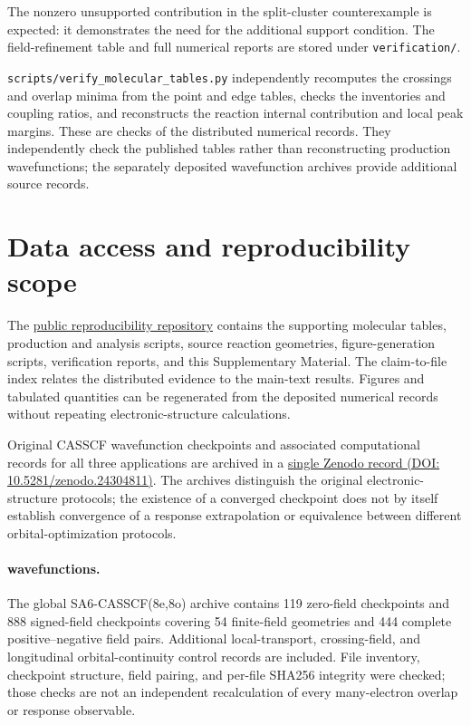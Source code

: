 \documentclass[aip,jcp,amsmath,amssymb,preprint,floatfix]{revtex4-1}
\begin{document}


The nonzero unsupported contribution in the split-cluster counterexample
is expected: it demonstrates the need for the additional support condition.
The field-refinement table and full numerical reports are stored under
\texttt{verification/}.

\texttt{scripts/verify\_molecular\_tables.py} independently recomputes the
 crossings and overlap minima from the point and edge tables,
checks the  inventories and coupling ratios, and reconstructs
the reaction internal contribution and local peak margins. These are
checks of the distributed numerical records. They independently check the published tables rather than reconstructing
production wavefunctions; the separately deposited wavefunction archives
provide additional source records.

\section{Data access and reproducibility scope}\label{sec:data}
The \href{https://github.com/zzdbl520/quantum-geometry-response-data/tree/main/multistate}{public reproducibility repository}
contains the supporting molecular tables, production and analysis scripts,
source reaction geometries, figure-generation scripts, verification reports,
and this Supplementary Material. The claim-to-file index relates the
distributed evidence to the main-text results. Figures and tabulated
quantities can be regenerated from the deposited numerical records without
repeating electronic-structure calculations.

Original CASSCF wavefunction checkpoints and associated computational
records for all three applications are archived in a
\href{https://doi.org/10.5281/zenodo.24304811}{single Zenodo record
(DOI: 10.5281/zenodo.24304811)}. The archives distinguish the original
electronic-structure protocols; the existence of a converged checkpoint
does not by itself establish convergence of a response extrapolation
or equivalence between different orbital-optimization protocols.

\paragraph*{\texorpdfstring{}{C2} wavefunctions.}
The global SA6-CASSCF(8e,8o) archive contains 119 zero-field checkpoints
and 888 signed-field checkpoints covering 54 finite-field geometries and
444 complete positive--negative field pairs. Additional local-transport,
crossing-field, and longitudinal orbital-continuity control records are
included. File inventory, checkpoint structure, field pairing, and
per-file SHA256 integrity were checked; those checks are not an independent
recalculation of every many-electron overlap or response observable.
\end{document}
